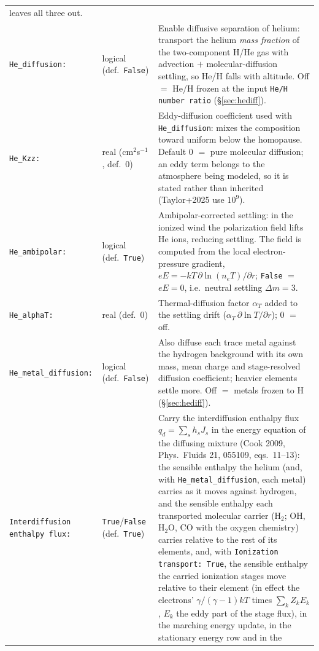 \documentclass[english,a4paper]{my_memo}
\begin{document}
\begin{longtable}{@{}p{}p{}p{}@{}}
  leaves all three out. \\
\texttt{He\_diffusion:} & logical (def.\ \texttt{False}) & Enable diffusive
  separation of helium: transport the helium \emph{mass fraction} of the
  two-component H/He gas with advection $+$ molecular-diffusion settling, so
  He/H falls with altitude. Off $=$ He/H frozen at the input \texttt{He/H
  number ratio} (\S\ref{sec:hediff}). \\
\texttt{He\_Kzz:} & real (cm$^2$s$^{-1}$, def.\ 0) & Eddy-diffusion
  coefficient used with \texttt{He\_diffusion}: mixes the composition toward
  uniform below the homopause. Default 0 $=$ pure molecular diffusion; an eddy
  term belongs to the atmosphere being modeled, so it is stated rather than
  inherited (Taylor+2025 use $10^{9}$). \\
\texttt{He\_ambipolar:} & logical (def.\ \texttt{True}) & Ambipolar-corrected
  settling: in the ionized wind the polarization field lifts He ions,
  reducing settling. The field is computed from the local electron-pressure
  gradient, $eE=-kT\,\partial\ln(n_eT)/\partial r$;
  \texttt{False} $=$ $eE=0$, i.e.\ neutral settling $\Delta m=3$. \\
\texttt{He\_alphaT:} & real (def.\ 0) & Thermal-diffusion factor $\alpha_T$
  added to the settling drift ($\alpha_T\,\partial\ln T/\partial r$); 0 $=$ off. \\
\texttt{He\_metal\_diffusion:} & logical (def.\ \texttt{False}) & Also diffuse
  each trace metal against the hydrogen background with its own mass, mean
  charge and stage-resolved diffusion coefficient; heavier elements settle
  more. Off $=$ metals frozen to H (\S\ref{sec:hediff}). \\
\texttt{Interdiffusion enthalpy flux:} & \texttt{True}/\texttt{False}
  (def.\ \texttt{True}) & Carry the interdiffusion enthalpy flux
  $q_d=\sum_s h_sJ_s$ in the energy equation of the diffusing mixture
  (Cook 2009, Phys.\ Fluids 21, 055109, eqs.~11--13): the sensible enthalpy
  the helium (and, with \texttt{He\_metal\_diffusion}, each metal) carries as
  it moves against hydrogen, and the sensible enthalpy each transported
  molecular carrier (H$_2$; OH, H$_2$O, CO with the oxygen chemistry) carries
  relative to the rest of its elements, and, with \texttt{Ionization
  transport: True}, the sensible enthalpy the carried ionization stages move
  relative to their element (in effect the electrons' $\gamma/(\gamma-1)kT$
  times $\sum_k Z_k E_k$, $E_k$ the eddy part of the stage flux), in the
  marching energy update, in the stationary energy row and in the

\end{longtable}
\end{document}
